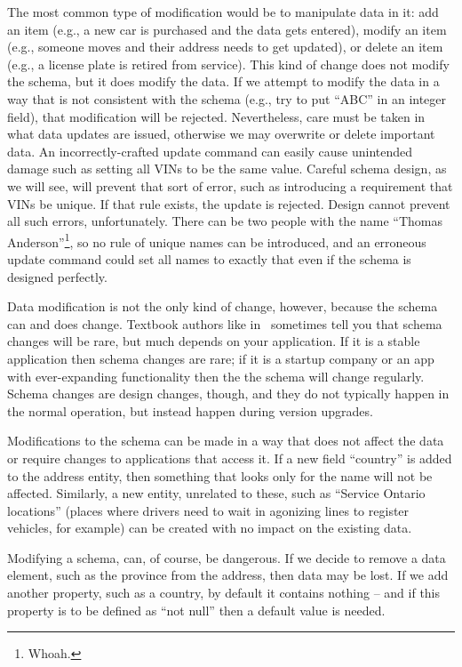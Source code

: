 \documentclass[a4paper]{report}
\begin{document}
The most common type of modification would be to manipulate data in it: add an item (e.g., a new car is purchased and the data gets entered), modify an item (e.g., someone moves and their address needs to get updated), or delete an item (e.g., a license plate is retired from service). This kind of change does not modify the schema, but it does modify the data. If we attempt to modify the data in a way that is not consistent with the schema (e.g., try to put ``ABC'' in an integer field), that modification will be rejected. Nevertheless, care must be taken in what data updates are issued, otherwise we may overwrite or delete important data. An incorrectly-crafted update command can easily cause unintended damage such as setting all VINs to be the same value. Careful schema design, as we will see, will prevent that sort of error, such as introducing a requirement that VINs be unique. If that rule exists, the update is rejected. Design cannot prevent all such errors, unfortunately. There can be two people with the name ``Thomas Anderson''\footnote{Whoah.}, so no rule of unique names can be introduced, and an erroneous update command could set all names to exactly that even if the schema is designed perfectly.

Data modification is not the only kind of change, however, because the schema can and does change. Textbook authors like in~\cite{fds} sometimes tell you that schema changes will be rare, but much depends on your application. If it is a stable application then schema changes are rare; if it is a startup company or an app with ever-expanding functionality then the the schema will change regularly. Schema changes are design changes, though, and they do not typically happen in the normal operation, but instead happen during version upgrades. 

Modifications to the schema can be made in a way that does not affect the data or require changes to applications that access it. If a new field ``country'' is added to the address entity, then something that looks only for the name will not be affected. Similarly, a new entity, unrelated to these, such as ``Service Ontario locations'' (places where drivers need to wait in agonizing lines to register vehicles, for example) can be created with no impact on the existing data.

Modifying a schema, can, of course, be dangerous. If we decide to remove a data element, such as the province from the address, then data may be lost. If we add another property, such as a country, by default it contains nothing -- and if this property is to be defined as ``not null'' then a default value is needed.
\end{document}
